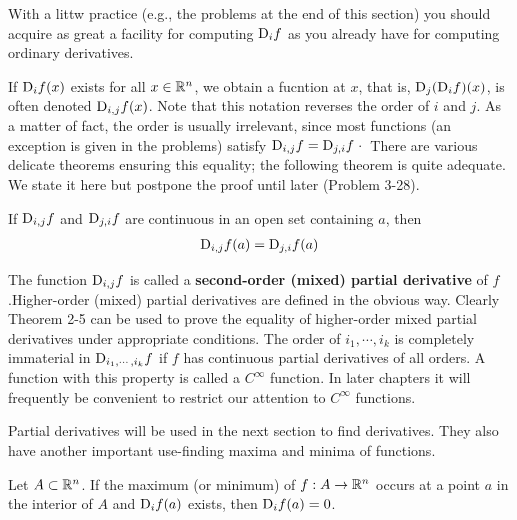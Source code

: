With a littw practice (e.g., the problems at the end of this
section) you should acquire as great a facility for computing
$\mathrm{D}_if$ as you already have for computing ordinary derivatives.

If $\mathrm{D}_if(x)$ exists for all $x\in \mathbb{R}^n$, we obtain a fucntion at $x$, that 
is, $\mathrm{D}_j(\mathrm{D}_if)(x)$, is often denoted $\mathrm{D}_{i,j}f(x)$. Note that this notation 
reverses the order of $i$ and $j$. As a matter of fact, the
order is usually irrelevant, since most functions (an exception is
given in the problems) satisfy $\mathrm{D}_{i,j}f = \mathrm{D}_{j,i}f$· There are various
delicate theorems ensuring this equality; the following theorem
is quite adequate. We state it here but postpone the proof until later (Problem 3-28).

\begin{theorem}
    If $\mathrm{D}_{i,j}f$ and $\mathrm{D}_{j,i}f$ are continuous in an open set containing $a$, then 
    \begin{align}
        \mathrm{D}_{i,j}f(a) = \mathrm{D}_{j,i}f(a)
    \end{align}
\end{theorem}

The function $\mathrm{D}_{i,j}f$ is called a \textbf{second-order (mixed) partial derivative}
of $f$.Higher-order (mixed) partial derivatives are defined in the obvious way.
Clearly Theorem 2-5 can be used to prove the equality of higher-order mixed
partial derivatives under appropriate conditions.
The order of $i_1, \cdots ,i_k$ is completely immaterial in $\mathrm{D}_{i_1,\cdots,i_k}f$
if $f$ has continuous partial derivatives of all orders. A function
with this property is called a $C^\infty$ function. In later chapters
it will frequently be convenient to restrict our attention to $C^\infty$
functions.

Partial derivatives will be used in the next section to find
derivatives. They also have another important use-finding
maxima and minima of functions.

\begin{theorem}
  Let $A\subset \mathbb{R}^n$. If the maximum (or minimum) of $f:A\to \mathbb{R}^n$ occurs at a 
  point $a$ in the interior of $A$ and $\mathrm{D}_if(a)$ exists, then $\mathrm{D}_if(a) = 0$.
\end{theorem}

